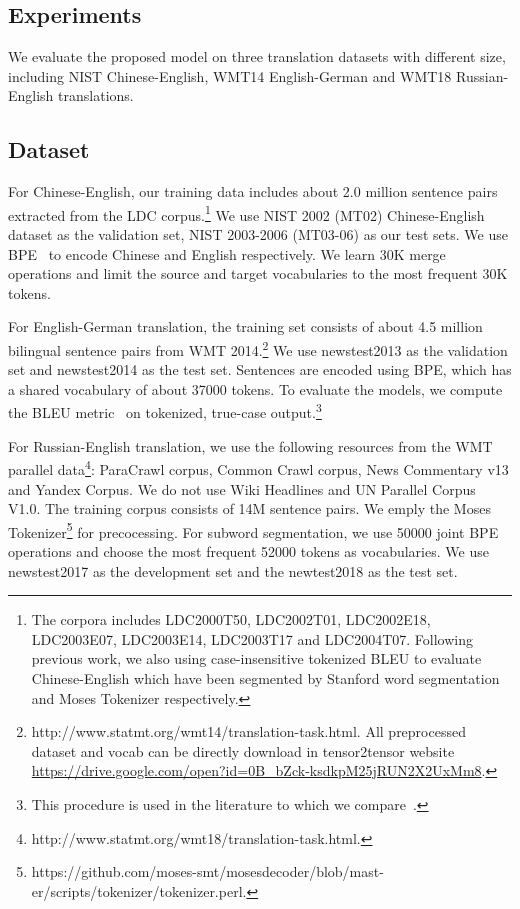 \documentclass[11pt,a4paper]{article}
\begin{document}
\begin{CJK*}{UTF8}{gbsn}
\section{Experiments}

We evaluate the proposed model on three translation datasets with different size, including NIST Chinese-English, WMT14 English-German and WMT18 Russian-English translations.


\subsection{Dataset}
For Chinese-English, our training data includes about 2.0 million sentence pairs extracted from the LDC corpus.{\footnote[4]{The corpora includes LDC2000T50, LDC2002T01, LDC2002E18, LDC2003E07, LDC2003E14, LDC2003T17 and LDC2004T07. Following previous work, we also using case-insensitive tokenized BLEU to evaluate Chinese-English which have been segmented by Stanford word segmentation and Moses Tokenizer respectively.}}
 We use NIST 2002 (MT02) Chinese-English dataset as the validation set, NIST 2003-2006 (MT03-06) as our test sets. We use BPE~\cite{Sennrich:2016A} to encode Chinese and English respectively. We learn 30K merge operations and limit the source and target vocabularies to the most frequent 30K tokens.

For English-German translation, the training set consists of about 4.5 million bilingual sentence pairs from WMT 2014.{\footnote[5]{http://www.statmt.org/wmt14/translation-task.html. All preprocessed dataset and vocab can be directly download in tensor2tensor website \url{https://drive.google.com/open?id=0B_bZck-ksdkpM25jRUN2X2UxMm8}.}}
We use newstest2013 as the validation set and newstest2014 as the test set.
Sentences are encoded using BPE, which has a shared vocabulary of about 37000 tokens.
To evaluate the models, we compute the BLEU metric~\cite{P02-1040} on tokenized, true-case output.{\footnote[6]{This procedure is used in the literature to which we compare~\cite{Wu:2016, gehring2017convolutional, vaswani2017attention}.}}

For Russian-English translation, we use the following resources from the WMT parallel data{\footnote[7]{http://www.statmt.org/wmt18/translation-task.html.}}: ParaCrawl corpus, Common Crawl corpus, News Commentary v13 and Yandex Corpus. We do not use Wiki Headlines and UN Parallel Corpus V1.0. The training corpus consists of 14M sentence pairs. We emply the Moses Tokenizer{\footnote[8]{https://github.com/moses-smt/mosesdecoder/blob/mast-er/scripts/tokenizer/tokenizer.perl.}} for precocessing. For subword segmentation, we use 50000 joint BPE operations and choose the most frequent 52000 tokens as vocabularies. We use newstest2017 as the development set and the newtest2018 as the test set.



\end{CJK*}
\end{document}
